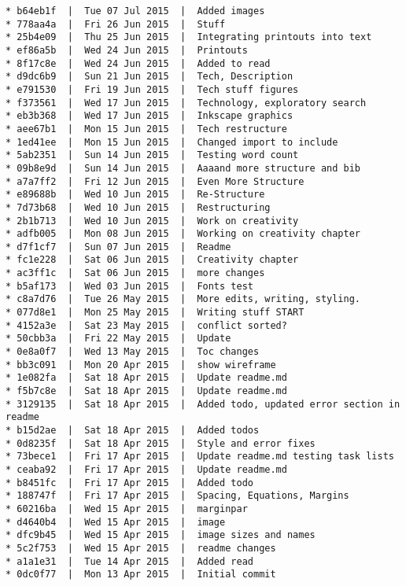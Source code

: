 \begin{verbatim}
* b64eb1f  |  Tue 07 Jul 2015  |  Added images
* 778aa4a  |  Fri 26 Jun 2015  |  Stuff
* 25b4e09  |  Thu 25 Jun 2015  |  Integrating printouts into text
* ef86a5b  |  Wed 24 Jun 2015  |  Printouts
* 8f17c8e  |  Wed 24 Jun 2015  |  Added to read
* d9dc6b9  |  Sun 21 Jun 2015  |  Tech, Description
* e791530  |  Fri 19 Jun 2015  |  Tech stuff figures
* f373561  |  Wed 17 Jun 2015  |  Technology, exploratory search
* eb3b368  |  Wed 17 Jun 2015  |  Inkscape graphics
* aee67b1  |  Mon 15 Jun 2015  |  Tech restructure
* 1ed41ee  |  Mon 15 Jun 2015  |  Changed import to include
* 5ab2351  |  Sun 14 Jun 2015  |  Testing word count
* 09b8e9d  |  Sun 14 Jun 2015  |  Aaaand more structure and bib
* a7a7ff2  |  Fri 12 Jun 2015  |  Even More Structure
* e89688b  |  Wed 10 Jun 2015  |  Re-Structure
* 7d73b68  |  Wed 10 Jun 2015  |  Restructuring
* 2b1b713  |  Wed 10 Jun 2015  |  Work on creativity
* adfb005  |  Mon 08 Jun 2015  |  Working on creativity chapter
* d7f1cf7  |  Sun 07 Jun 2015  |  Readme
* fc1e228  |  Sat 06 Jun 2015  |  Creativity chapter
* ac3ff1c  |  Sat 06 Jun 2015  |  more changes
* b5af173  |  Wed 03 Jun 2015  |  Fonts test
* c8a7d76  |  Tue 26 May 2015  |  More edits, writing, styling.
* 077d8e1  |  Mon 25 May 2015  |  Writing stuff START
* 4152a3e  |  Sat 23 May 2015  |  conflict sorted?
* 50cbb3a  |  Fri 22 May 2015  |  Update
* 0e8a0f7  |  Wed 13 May 2015  |  Toc changes
* bb3c091  |  Mon 20 Apr 2015  |  show wireframe
* 1e082fa  |  Sat 18 Apr 2015  |  Update readme.md
* f5b7c8e  |  Sat 18 Apr 2015  |  Update readme.md
* 3129135  |  Sat 18 Apr 2015  |  Added todo, updated error section in readme
* b15d2ae  |  Sat 18 Apr 2015  |  Added todos
* 0d8235f  |  Sat 18 Apr 2015  |  Style and error fixes
* 73bece1  |  Fri 17 Apr 2015  |  Update readme.md testing task lists
* ceaba92  |  Fri 17 Apr 2015  |  Update readme.md
* b8451fc  |  Fri 17 Apr 2015  |  Added todo
* 188747f  |  Fri 17 Apr 2015  |  Spacing, Equations, Margins
* 60216ba  |  Wed 15 Apr 2015  |  marginpar
* d4640b4  |  Wed 15 Apr 2015  |  image
* dfc9b45  |  Wed 15 Apr 2015  |  image sizes and names
* 5c2f753  |  Wed 15 Apr 2015  |  readme changes
* a1a1e31  |  Tue 14 Apr 2015  |  Added read
* 0dc0f77  |  Mon 13 Apr 2015  |  Initial commit
\end{verbatim}